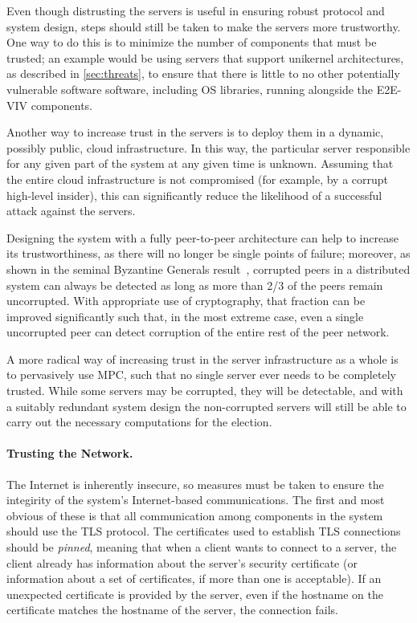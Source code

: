 Even though distrusting the servers is useful in ensuring robust
protocol and system design, steps should still be taken to make the
servers more trustworthy.  One way to do this is to minimize the
number of components that must be trusted; an example would be using
servers that support unikernel architectures, as described in
\autoref{sec:threats}, to ensure that there is little to no other
potentially vulnerable software software, including OS libraries,
running alongside the E2E-VIV components.

Another way to increase trust in the servers is to deploy them in a
dynamic, possibly public, cloud infrastructure. In this way, the
particular server responsible for any given part of the system at any
given time is unknown. Assuming that the entire cloud infrastructure
is not compromised (for example, by a corrupt high-level insider),
this can significantly reduce the likelihood of a successful attack
against the servers.

Designing the system with a fully peer-to-peer architecture can help
to increase its trustworthiness, as there will no longer be single
points of failure; moreover, as shown in the seminal Byzantine
Generals result~\cite{Lamport82}, corrupted peers in a distributed
system can always be detected as long as more than 2/3 of the peers
remain uncorrupted. With appropriate use of cryptography, that
fraction can be improved significantly such that, in the most extreme
case, even a single uncorrupted peer can detect corruption of the
entire rest of the peer network.

A more radical way of increasing trust in the server infrastructure as
a whole is to pervasively use MPC, such that no single server ever
needs to be completely trusted. While some servers may be corrupted,
they will be detectable, and with a suitably redundant system design
the non-corrupted servers will still be able to carry out the
necessary computations for the election.

\paragraph{Trusting the Network.} The Internet is inherently insecure,
so measures must be taken to ensure the integirity of the system's
Internet-based communications. The first and most obvious of these is
that all communication among components in the system should use the
TLS protocol. The certificates used to establish TLS connections
should be \emph{pinned}, meaning that when a client wants to connect
to a server, the client already has information about the server's
security certificate (or information about a set of certificates, if
more than one is acceptable). If an unexpected certificate is provided
by the server, even if the hostname on the certificate matches the
hostname of the server, the connection fails.

